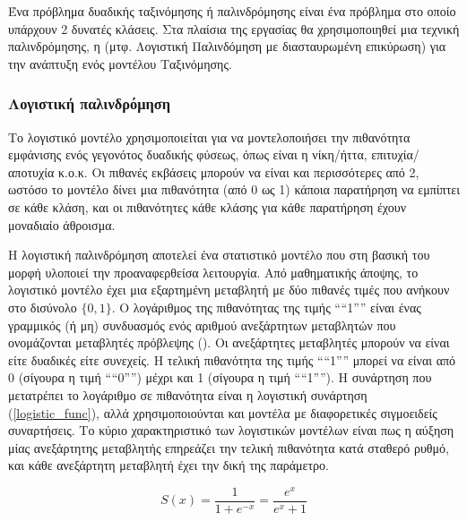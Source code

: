 Ένα πρόβλημα δυαδικής ταξινόμησης ή παλινδρόμησης είναι ένα πρόβλημα στο οποίο υπάρχουν 
2 δυνατές κλάσεις. Στα πλαίσια της εργασίας θα χρησιμοποιηθεί μια τεχνική παλινδρόμησης,
η  (μτφ. Λογιστική Παλινδόμηση με διασταυρωμένη επικύρωση) για την ανάπτυξη ενός μοντέλου Ταξινόμησης.

\subsubsection{Λογιστική παλινδρόμηση}

Το λογιστικό μοντέλο χρησιμοποιείται για να μοντελοποιήσει την πιθανότητα εμφάνισης ενός
γεγονότος δυαδικής φύσεως, όπως είναι η νίκη/ήττα, επιτυχία/αποτυχία κ.ο.κ. Οι πιθανές
 εκβάσεις μπορούν να είναι και περισσότερες από 2, ωστόσο το μοντέλο δίνει μια πιθανότητα
(από 0 ως 1) κάποια παρατήρηση να εμπίπτει σε κάθε κλάση, και οι πιθανότητες κάθε κλάσης
για κάθε παρατήρηση έχουν μοναδιαίο άθροισμα.

Η λογιστική παλινδρόμηση \cite{10.1001/jama.2016.7653} αποτελεί ένα στατιστικό μοντέλο που
στη βασική του μορφή υλοποιεί την προαναφερθείσα λειτουργία. Από μαθηματικής άποψης, το 
λογιστικό μοντέλο έχει μια εξαρτημένη μεταβλητή με δύο πιθανές τιμές που ανήκουν στο δισύνολο \(\{0, 1\}\).
Ο λογάριθμος της πιθανότητας της τιμής ````1'''' είναι ένας γραμμικός (ή μη) συνδυασμός ενός
αριθμού ανεξάρτητων μεταβλητών που ονομάζονται μεταβλητές πρόβλεψης (). Οι
ανεξάρτητες μεταβλητές μπορούν να είναι είτε δυαδικές είτε συνεχείς. Η τελική πιθανότητα της
τιμής ````1'''' μπορεί να είναι από 0 (σίγουρα η τιμή ````0'''') μέχρι και 1 (σίγουρα η τιμή ````1''''). Η
συνάρτηση που μετατρέπει το λογάριθμο σε πιθανότητα είναι η λογιστική συνάρτηση
(\ref{logistic_func}), αλλά χρησιμοποιούνται και μοντέλα με διαφορετικές σιγμοειδείς
συναρτήσεις. Το κύριο χαρακτηριστικό των λογιστικών μοντέλων είναι πως η αύξηση μίας
ανεξάρτητης μεταβλητής επηρεάζει την τελική πιθανότητα κατά σταθερό ρυθμό, και κάθε 
ανεξάρτητη μεταβλητή έχει την δική της παράμετρο.

\begin{equation}
    S(x) = \frac{1}{1 + e^{-x}} = \frac{e^x}{e^{x} + 1}
    \label{logistic_func}
\end{equation}

